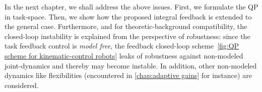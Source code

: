 In the next chapter, we shall address the above issues. First, we formulate the QP in task-space. Then, we show how the proposed integral feedback is extended to the general case. Furthermore, and for theoretic-background compatibility, the closed-loop instability is explained from the perspective of robustness: since the task feedback control is \emph{model free},  the feedback closed-loop scheme~\cref{fig:QP scheme for kinematic-control robots} leaks of robustness against non-modeled joint-dynamics and thereby may become instable. In addition, other non-modeled dynamics like flexibilities (encountered in \cref{chap:adaptive gains} for instance) are considered. 

